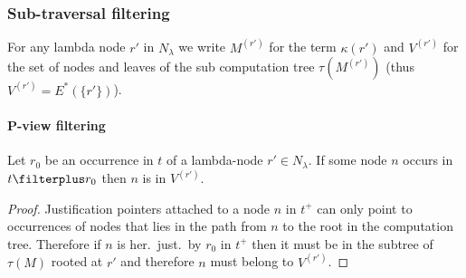 \subsubsection{Sub-traversal filtering}

For any lambda node $r'$ in $N_\lambda$ we write
$M^{(r')}$ for the term $\kappa(r')$ and $V^{(r')}$ for the set of nodes and leaves of the sub computation tree $\tau(M^{(r')})$ (thus $V^{(r')} = E^*(\{r'\})$).

\paragraph{P-view filtering}

\begin{lemma}
\label{lem:instarfilter_imp_insubtree} Let $r_0$ be an occurrence in
$t$ of a lambda-node $r' \in N_\lambda$. If some node $n$ occurs in $t
\filterplus r_0$ then $n$ is in $V^{(r')}$.
\end{lemma}
\begin{proof}
Justification pointers attached to a node $n$ in $t^+$ can only point to
 occurrences of nodes that lies in the path from $n$ to the root
 in the computation tree. Therefore if $n$ is her.\
 just.\ by $r_0$ in $t^+$ then it must be in the subtree of $\tau(M)$ rooted
 at $r'$ and  therefore $n$ must belong to $V^{(r')}$.
\end{proof}

